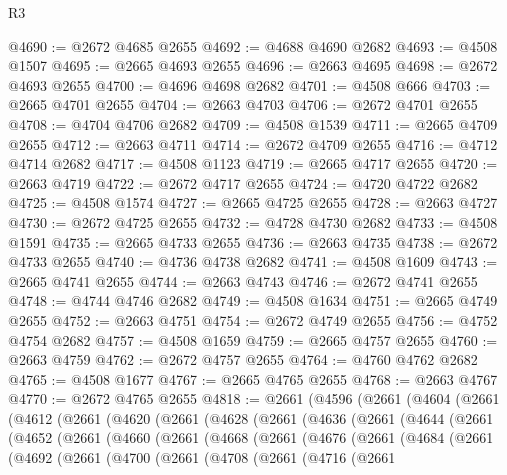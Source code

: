 \begin{lexlean}{R3}
\begin{coremodule}
@4690 := @2672 @4685 @2655
@4692 := @4688 @4690 @2682
@4693 := @4508 @1507
@4695 := @2665 @4693 @2655
@4696 := @2663 @4695
@4698 := @2672 @4693 @2655
@4700 := @4696 @4698 @2682
@4701 := @4508 @666
@4703 := @2665 @4701 @2655
@4704 := @2663 @4703
@4706 := @2672 @4701 @2655
@4708 := @4704 @4706 @2682
@4709 := @4508 @1539
@4711 := @2665 @4709 @2655
@4712 := @2663 @4711
@4714 := @2672 @4709 @2655
@4716 := @4712 @4714 @2682
@4717 := @4508 @1123
@4719 := @2665 @4717 @2655
@4720 := @2663 @4719
@4722 := @2672 @4717 @2655
@4724 := @4720 @4722 @2682
@4725 := @4508 @1574
@4727 := @2665 @4725 @2655
@4728 := @2663 @4727
@4730 := @2672 @4725 @2655
@4732 := @4728 @4730 @2682
@4733 := @4508 @1591
@4735 := @2665 @4733 @2655
@4736 := @2663 @4735
@4738 := @2672 @4733 @2655
@4740 := @4736 @4738 @2682
@4741 := @4508 @1609
@4743 := @2665 @4741 @2655
@4744 := @2663 @4743
@4746 := @2672 @4741 @2655
@4748 := @4744 @4746 @2682
@4749 := @4508 @1634
@4751 := @2665 @4749 @2655
@4752 := @2663 @4751
@4754 := @2672 @4749 @2655
@4756 := @4752 @4754 @2682
@4757 := @4508 @1659
@4759 := @2665 @4757 @2655
@4760 := @2663 @4759
@4762 := @2672 @4757 @2655
@4764 := @4760 @4762 @2682
@4765 := @4508 @1677
@4767 := @2665 @4765 @2655
@4768 := @2663 @4767
@4770 := @2672 @4765 @2655
@4818 := @2661
    (@4596
      (@2661
        (@4604
          (@2661
            (@4612
              (@2661
                (@4620
                  (@2661
                    (@4628
                      (@2661
                        (@4636
                          (@2661
                            (@4644
                              (@2661
                                (@4652
                                  (@2661
                                    (@4660
                                      (@2661
                                        (@4668
                                          (@2661
                                            (@4676
                                              (@2661
                                                (@4684
                                                  (@2661
                                                    (@4692
                                                      (@2661
                                                        (@4700
                                                          (@2661
                                                            (@4708
                                                              (@2661
                                                                (@4716
                                                                  (@2661

\end{coremodule}
\end{lexlean}
